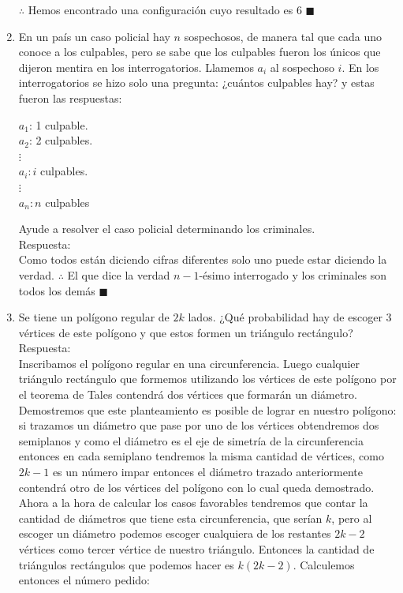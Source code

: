 \documentclass{book}
\begin{document}
\begin{enumerate}
        $\therefore$ Hemos encontrado una configuración cuyo resultado es 6 $\blacksquare$\\
        \item En un país un caso policial hay $n$ sospechosos, de manera tal que cada uno conoce a los culpables, pero se sabe que los culpables fueron los únicos que dijeron mentira en los interrogatorios. Llamemos $a_i$ al sospechoso $i$. En los interrogatorios se hizo solo una pregunta: ¿cuántos culpables hay? y estas fueron las respuestas:
        \begin{center}
            $a_1$: 1 culpable.\\
            $a_2$: 2 culpables.\\
            $\vdots$\\
            $a_i: i$ culpables.\\
            $\vdots$\\
            $a_n: n$ culpables
        \end{center}
        Ayude a resolver el caso policial determinando los criminales.\\
        Respuesta:\\
        Como todos están diciendo cifras diferentes solo uno puede estar diciendo la verdad. $\therefore$ El que dice la verdad $n-1$-ésimo interrogado y los criminales son todos los demás $\blacksquare$\\
        \item Se tiene un polígono regular de $2k$ lados. ¿Qué probabilidad hay de escoger 3 vértices de este polígono y que estos formen un triángulo rectángulo?\\
        Respuesta:\\
        Inscribamos el polígono regular en una circunferencia. Luego cualquier triángulo rectángulo que formemos utilizando los vértices de este polígono por el teorema de Tales contendrá dos vértices que formarán un diámetro. Demostremos que este planteamiento es posible de lograr en nuestro polígono: si trazamos un diámetro que pase por uno de los vértices obtendremos dos semiplanos y como el diámetro es el eje de simetría de la circunferencia entonces en cada semiplano tendremos la misma cantidad de vértices, como $2k-1$ es un número impar entonces el diámetro trazado anteriormente contendrá otro de los vértices del polígono con lo cual queda demostrado.
        Ahora a la hora de calcular los casos favorables tendremos que contar la cantidad de diámetros que tiene esta circunferencia, que serían $k$, pero al escoger un diámetro podemos escoger cualquiera de los restantes $2k-2$ vértices como tercer vértice de nuestro triángulo. Entonces la cantidad de triángulos rectángulos que podemos hacer es $k(2k-2)$. Calculemos entonces el número pedido:

\end{enumerate}
\end{document}
